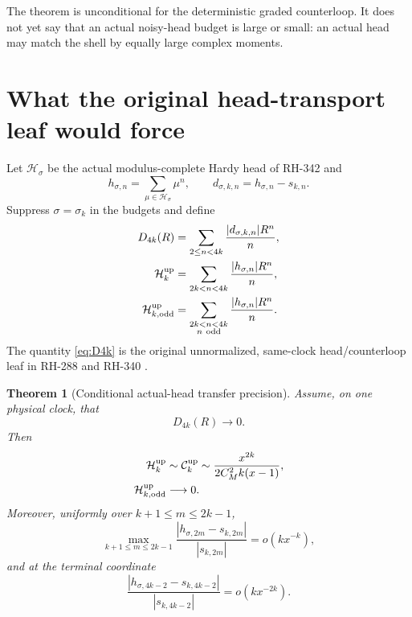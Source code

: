 \documentclass[11pt]{article}
\newtheorem{theorem}{Theorem}[section]
\theoremstyle{remark}
\newcommand{\cH}{\mathcal H}
\begin{document}
The theorem is unconditional for the deterministic graded counterloop.  It
does not yet say that an actual noisy-head budget is large or small: an
actual head may match the shell by equally large complex moments.

\section{What the original head-transport leaf would force}

Let $\cH_\sigma$ be the actual modulus-complete Hardy head of RH-342 and
\begin{equation}\label{eq:h-d}
 h_{\sigma,n}=\sum_{\mu\in\cH_\sigma}\mu^n,
 \qquad d_{\sigma,k,n}=h_{\sigma,n}-s_{k,n}.
\end{equation}
Suppress $\sigma=\sigma_k$ in the budgets and define
\begin{align}
 D_{4k}(R)
 &=\sum_{2\le n<4k}\frac{|d_{\sigma,k,n}|R^n}{n},
 \label{eq:D4k}\\
 \mathcal H_k^{\rm up}
 &=\sum_{2k<n<4k}\frac{|h_{\sigma,n}|R^n}{n},
 \label{eq:Hup}\\
 \mathcal H_{k,\rm odd}^{\rm up}
 &=\sum_{\substack{2k<n<4k\\ n\ \mathrm{odd}}}
 \frac{|h_{\sigma,n}|R^n}{n}.
 \label{eq:Hodd}
\end{align}
The quantity \eqref{eq:D4k} is the original unnormalized, same-clock
head/counterloop leaf in RH-288 and RH-340
\citep{WangGluing2026,WangSynchronization2026}.

\begin{theorem}[Conditional actual-head transfer precision]
\label{thm:conditional}
Assume, on one physical clock, that
\begin{equation}\label{eq:D-assumption}
 D_{4k}(R)\longrightarrow0.
\end{equation}
Then
\begin{align}
 \mathcal H_k^{\rm up}
 &\sim\mathcal C_k^{\rm up}
 \sim\frac{x^{2k}}{2C_M^2k(x-1)},
 \label{eq:H-asymptotic}\\
 \mathcal H_{k,\rm odd}^{\rm up}&\longrightarrow0.
 \label{eq:Hodd-zero}
\end{align}
Moreover, uniformly over $k+1\le m\le2k-1$,
\begin{equation}\label{eq:uniform-relative}
 \max_{k+1\le m\le2k-1}
 \frac{|h_{\sigma,2m}-s_{k,2m}|}{|s_{k,2m}|}
 =o(kx^{-k}),
\end{equation}
and at the terminal coordinate
\begin{equation}\label{eq:terminal-relative}
 \frac{|h_{\sigma,4k-2}-s_{k,4k-2}|}
 {|s_{k,4k-2}|}
 =o(kx^{-2k}).
\end{equation}
\end{theorem}
\end{document}
